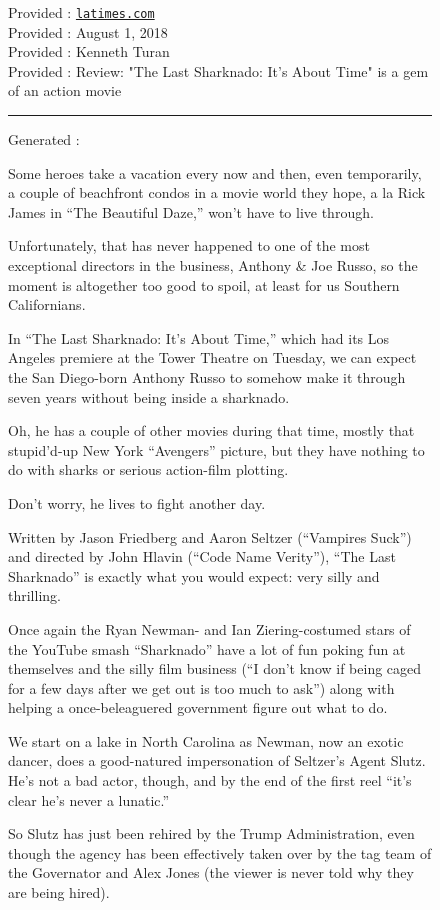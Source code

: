 \documentclass{article}
\begin{document}
\begin{figure}[t]
Provided \domainfield: {\tt\small \href{https://latimes.com}{latimes.com}} \\
Provided \datefield: August 1, 2018 \\
Provided \authorsfield: Kenneth Turan \\
Provided \headlinefield: Review: "The Last Sharknado: It's About Time" is a gem of an action movie

\hrule
Generated \bodyfield:
{\small
Some heroes take a vacation every now and then, even temporarily, a couple of beachfront condos in a movie world they hope, a la Rick James in “The Beautiful Daze,” won’t have to live through.

Unfortunately, that has never happened to one of the most exceptional directors in the business, Anthony \& Joe Russo, so the moment is altogether too good to spoil, at least for us Southern Californians.

In “The Last Sharknado: It’s About Time,” which had its Los Angeles premiere at the Tower Theatre on Tuesday, we can expect the San Diego-born Anthony Russo to somehow make it through seven years without being inside a sharknado.

Oh, he has a couple of other movies during that time, mostly that stupid’d-up New York “Avengers” picture, but they have nothing to do with sharks or serious action-film plotting.

Don’t worry, he lives to fight another day.

Written by Jason Friedberg and Aaron Seltzer (“Vampires Suck”) and directed by John Hlavin (“Code Name Verity”), “The Last Sharknado” is exactly what you would expect: very silly and thrilling.

Once again the Ryan Newman- and Ian Ziering-costumed stars of the YouTube smash “Sharknado” have a lot of fun poking fun at themselves and the silly film business (“I don’t know if being caged for a few days after we get out is too much to ask”) along with helping a once-beleaguered government figure out what to do.

We start on a lake in North Carolina as Newman, now an exotic dancer, does a good-natured impersonation of Seltzer’s Agent Slutz. He’s not a bad actor, though, and by the end of the first reel “it’s clear he’s never a lunatic.”

So Slutz has just been rehired by the Trump Administration, even though the agency has been effectively taken over by the tag team of the Governator and Alex Jones (the viewer is never told why they are being hired).

}
\end{figure}
\end{document}
